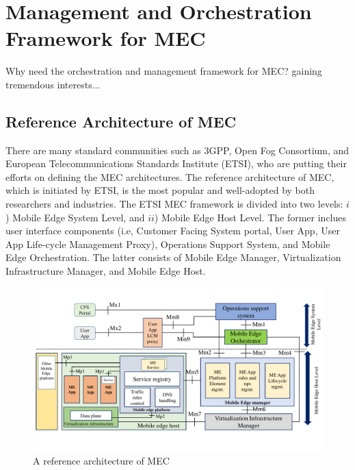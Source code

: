 \section{Management and Orchestration Framework for MEC} \label{framework}

Why need the orchestration and management framework for MEC? gaining tremendous interests...


\subsection{Reference Architecture of MEC}

There are many standard communities such as 3GPP, Open Fog Consortium, and European Telecommunications Standards Institute (ETSI), who are putting their efforts on defining the MEC architectures. 
The reference architecture of MEC, which is initiated by ETSI, is the most popular and well-adopted by both researchers and industries. The ETSI MEC framework is divided into two levels: $i$) Mobile Edge System Level, and $ii$) Mobile Edge Host Level. The former inclues user interface components (i.e, Customer Facing System portal, User App, User App Life-cycle Management Proxy), Operations Support System, and Mobile Edge Orchestration. The latter consists of Mobile Edge Manager, Virtualization Infrastructure Manager, and Mobile Edge Host.


\begin{figure}[H]
  \begin{center}
   \includegraphics[width=15cm]{./figures/book-etsi-mec.pdf}
   \caption{A reference architecture of MEC}
   \label{fig:etsi-mec}
   \end{center}
\end{figure}



